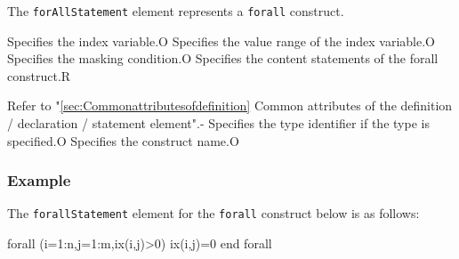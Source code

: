 The {\tt forAllStatement} element represents a {\tt forall} construct.


\begin{XcodeMLChildElements}
{Specifies the index variable.}{O}
{Specifies the value range of the index variable.}{O}
{Specifies the masking condition.}{O}
{Specifies the content statements of the forall construct.}{R}
\end{XcodeMLChildElements}

\begin{XcodeMLAttributes}
{Refer to "\ref{sec:Commonattributesofdefinition} Common attributes of the definition / declaration / statement element".}{-}
{Specifies the type identifier if the type is specified.}{O}
{Specifies the construct name.}{O}
\end{XcodeMLAttributes}

\subsubsection*{Example}

The {\tt forallStatement} element for the {\tt forall} construct below is as follows:
\vspace{2mm}

\begin{Fexample2008}
forall (i=1:n,j=1:m,ix(i,j)>0)
 ix(i,j)=0
end forall
\end{Fexample2008}
\vspace{1mm}

